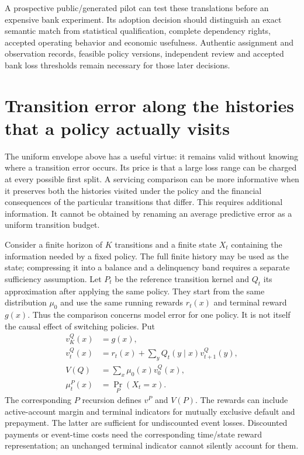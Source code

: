 A prospective public/generated pilot can test these translations before an
expensive bank experiment. Its adoption decision should distinguish an exact
semantic match from statistical qualification, complete dependency rights,
accepted operating behavior and economic usefulness. Authentic assignment and
observation records, feasible policy versions, independent review and accepted
bank loss thresholds remain necessary for those later decisions.
\citep{exec17_s5_design}



\section{Transition error along the histories that a policy actually visits}
\label{exec17:s5-occupied}

The uniform envelope above has a useful virtue: it remains valid without
knowing where a transition error occurs. Its price is that a large loss range
can be charged at every possible first split. A servicing comparison can be
more informative when it preserves both the histories visited under the
policy and the financial consequences of the particular transitions that
differ. This requires additional information. It cannot be obtained by
renaming an average predictive error as a uniform transition budget.

Consider a finite horizon of $K$ transitions and a finite state $X_t$ containing
the information needed by a fixed policy. The full finite history may be used
as the state; compressing it into a balance and a delinquency band requires a
separate sufficiency assumption. Let $P_t$ be the reference transition kernel
and $Q_t$ its approximation after applying the same policy. They start from
the same distribution $\mu_0$ and use the same running rewards $r_t(x)$ and
terminal reward $g(x)$. Thus the comparison concerns model error for one
policy. It is not itself the causal effect of switching policies. Put
\begin{equation}
 \begin{split}
 v^Q_K(x)&=g(x),\\
 v^Q_t(x)&=r_t(x)+\sum_y Q_t(y\mid x)v^Q_{t+1}(y),\\
 V(Q)&=\sum_x\mu_0(x)v^Q_0(x),\\
 \mu^P_t(x)&=\Pr_P(X_t=x).
 \end{split}
 \label{exec17:s5-occupied-values}
\end{equation}
The corresponding $P$ recursion defines $v^P$ and $V(P)$. The rewards can
include active-account margin and terminal indicators for mutually exclusive
default and prepayment. The latter are sufficient for undiscounted event
losses. Discounted payments or event-time costs need the corresponding
time/state reward representation; an unchanged terminal indicator cannot
silently account for them.

